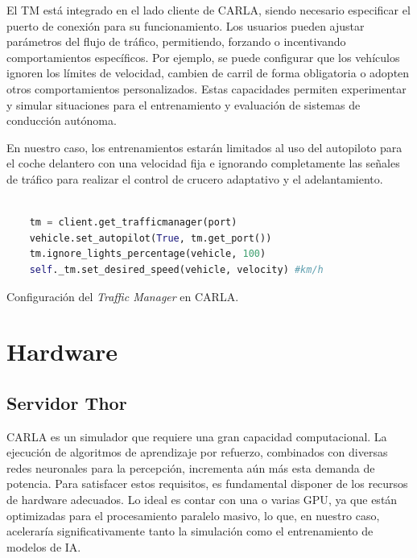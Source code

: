 El \ac{TM} está integrado en el lado cliente de CARLA, siendo necesario especificar el puerto de conexión para su funcionamiento. Los usuarios pueden ajustar parámetros del flujo de tráfico, permitiendo, forzando o incentivando comportamientos específicos. Por ejemplo, se puede configurar que los vehículos ignoren los límites de velocidad, cambien de carril de forma obligatoria o adopten otros comportamientos personalizados. Estas capacidades permiten experimentar y simular situaciones para el entrenamiento y evaluación de sistemas de conducción autónoma.

En nuestro caso, los entrenamientos estarán limitados al uso del autopiloto para el coche delantero con una velocidad fija e ignorando completamente las señales de tráfico para realizar el control de crucero adaptativo y el adelantamiento. 

\begin{code}[h]
	\begin{lstlisting}[language=python]
	
	tm = client.get_trafficmanager(port)
	vehicle.set_autopilot(True, tm.get_port())  
	tm.ignore_lights_percentage(vehicle, 100) 
	self._tm.set_desired_speed(vehicle, velocity) #km/h
\end{lstlisting}
\caption[Configuración del \textit{Traffic Manager} en CARLA]{Configuración del \textit{Traffic Manager} en CARLA.}
\label{cod:tm_carla}
\end{code}

\section{Hardware}
\label{sec:hw}
\subsection{Servidor Thor}
\label{sec:thor}

CARLA es un simulador que requiere una gran capacidad computacional. La ejecución de algoritmos de aprendizaje por refuerzo, combinados con diversas redes neuronales para la percepción, incrementa aún más esta demanda de potencia. Para satisfacer estos requisitos, es fundamental disponer de los recursos de hardware adecuados. Lo ideal es contar con una o varias \ac{GPU}, ya que están optimizadas para el procesamiento paralelo masivo, lo que, en nuestro caso, aceleraría significativamente tanto la simulación como el entrenamiento de modelos de \ac{IA}. 

